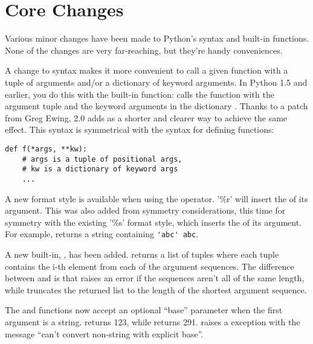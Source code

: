 \documentclass{howto}
\begin{document}
\section{Core Changes}

Various minor changes have been made to Python's syntax and built-in
functions.  None of the changes are very far-reaching, but they're
handy conveniences.

A change to syntax makes it more convenient to call a given function
with a tuple of arguments and/or a dictionary of keyword arguments.
In Python 1.5 and earlier, you do this with the 
built-in function:  calls the
function  with the argument tuple  and the
keyword arguments in the dictionary .  Thanks to a patch from
Greg Ewing, 2.0 adds  as a shorter
and clearer way to achieve the same effect.  This syntax is
symmetrical with the syntax for defining functions:

\begin{verbatim}
def f(*args, **kw):
    # args is a tuple of positional args,
    # kw is a dictionary of keyword args
    ...
\end{verbatim}

A new format style is available when using the \code{\%} operator.
'\%r' will insert the  of its argument.  This was
also added from symmetry considerations, this time for symmetry with
the existing '\%s' format style, which inserts the  of
its argument.  For example,  returns a
string containing \verb|'abc' abc|.

A new built-in, , has been
added.   returns a list of tuples where each tuple
contains the i-th element from each of the argument sequences.  The
difference between  and  is that  raises an error if the sequences
aren't all of the same length, while  truncates the
returned list to the length of the shortest argument sequence.

The  and  functions now accept an
optional ``base'' parameter when the first argument is a string.
 returns 123, while  returns
291.   raises a  exception
with the message ``can't convert non-string with explicit base''.
\end{document}
